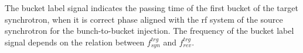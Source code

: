 %
%

 

The bucket label signal indicates the passing time of the first bucket of the target synchrotron, when it is correct phase aligned with the rf system of the source synchrotron for the bunch-to-bucket injection. The frequency of the bucket label signal depends on the relation between $f_{\mathit{syn}}^{\mathit{trg}}$ and $f_{\mathit{rev}}^{\mathit{trg}}$.

